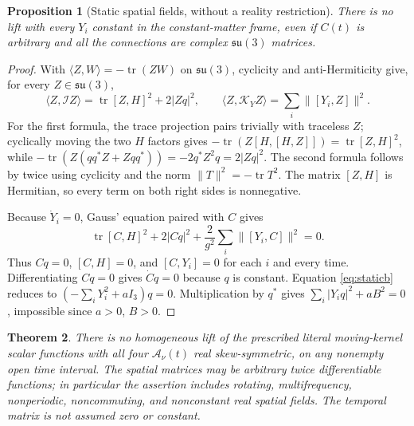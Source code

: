 \documentclass[11pt]{article}
\newtheorem{theorem}{Theorem}
\newtheorem{proposition}[theorem]{Proposition}
\newcommand{\su}{\mathfrak{su}}
\newcommand{\tr}{\operatorname{tr}}
\begin{document}
\begin{proposition}[Static spatial fields, without a reality restriction]
\label{prop:staticcomplex}
There is no lift with every $Y_i$ constant in the constant-matter frame,
even if $C(t)$ is arbitrary and all the connections are complex
$\su(3)$ matrices.
\end{proposition}
\begin{proof}
With $\langle Z,W\rangle=-\tr(ZW)$ on $\su(3)$, cyclicity and
anti-Hermiticity give, for every $Z\in\su(3)$,
\[
 \langle Z,\mathcal I Z\rangle
 =\tr[Z,H]^2+2|Zq|^2,\qquad
 \langle Z,\mathcal K_Y Z\rangle=\sum_i\|[Y_i,Z]\|^2.
\]
For the first formula, the trace projection pairs trivially with
traceless $Z$; cyclically moving the two $H$ factors gives
$-\tr(Z[H,[H,Z]])=\tr[Z,H]^2$, while
$-\tr(Z(qq^*Z+Zqq^*))=-2q^*Z^2q=2|Zq|^2$.
The second formula follows by twice using cyclicity and the norm
$\|T\|^2=-\tr T^2$. The matrix $[Z,H]$ is Hermitian, so every term
on both right sides is nonnegative.

Because $\dot Y_i=0$, Gauss' equation paired with $C$ gives
\[
 \tr[C,H]^2+2|Cq|^2+\frac2{g^2}\sum_i\|[Y_i,C]\|^2=0.
\]
Thus $Cq=0$, $[C,H]=0$, and $[C,Y_i]=0$ for each $i$ and every time.
Differentiating $Cq=0$ gives $\dot Cq=0$ because $q$ is constant.
Equation \eqref{eq:staticb} reduces to
$(-\sum_iY_i^2+aI_3)q=0$. Multiplication by $q^*$ gives
$\sum_i|Y_iq|^2+aB^2=0$, impossible since $a>0$, $B>0$.
\end{proof}

\begin{theorem}\label{thm:real}
There is no homogeneous lift of the prescribed literal moving-kernel
scalar functions with all four $\mathcal A_\nu(t)$ real skew-symmetric,
on any nonempty open time interval. The spatial matrices may be arbitrary
twice differentiable functions; in particular the assertion includes
rotating, multifrequency, nonperiodic, noncommuting, and nonconstant
real spatial fields. The temporal matrix is not assumed zero or constant.
\end{theorem}
\end{document}
